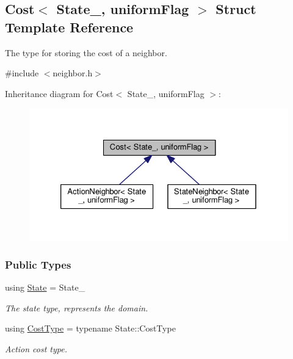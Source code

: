 \hypertarget{structCost}{}\subsection{Cost$<$ State\+\_\+, uniform\+Flag $>$ Struct Template Reference}
\label{structCost}


The type for storing the cost of a neighbor.  




{\ttfamily \#include $<$neighbor.\+h$>$}



Inheritance diagram for Cost$<$ State\+\_\+, uniform\+Flag $>$\+:\nopagebreak
\begin{figure}[H]
\begin{center}
\leavevmode
\includegraphics[width=326pt]{structCost__inherit__graph}
\end{center}
\end{figure}
\subsubsection*{Public Types}
\begin{DoxyCompactItemize}
\item 
using \hyperlink{structCost_a35c84b427ff64f117a9393e8d46b0f85}{State} = State\+\_\+\hypertarget{structCost_a35c84b427ff64f117a9393e8d46b0f85}{}\label{structCost_a35c84b427ff64f117a9393e8d46b0f85}

\begin{DoxyCompactList}\small\item\em The state type, represents the domain. \end{DoxyCompactList}\item 
using \hyperlink{structCost_a22a996cdc08b472c30d1f410496e041a}{Cost\+Type} = typename State\+::\+Cost\+Type\hypertarget{structCost_a22a996cdc08b472c30d1f410496e041a}{}\label{structCost_a22a996cdc08b472c30d1f410496e041a}

\begin{DoxyCompactList}\small\item\em Action cost type. \end{DoxyCompactList}\end{DoxyCompactItemize}
